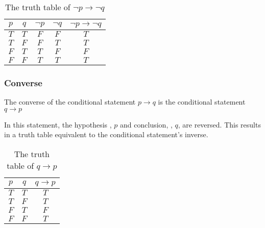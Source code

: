 \documentclass[12pt letter]{report}
\begin{document}
\begin{table}[h!]
	\caption{The truth table of $\neg p \to  \neg q$}\label{tab:7}
	\begin{center}
		\begin{tabular}{|c c|c c|c|}
			\hline
			$p$ & $q$ & $ \neg p $ & $\neg q$ & $\neg p \to  \neg q$ \\[0.5ex]
			\hline
			\hline
			$T$ & $T$ & $F$        & $F$      & $T$                  \\
			$T$ & $F$ & $F$        & $T$      & $T$                  \\
			$F$ & $T$ & $T$        & $F$      & $F$                  \\
			$F$ & $F$ & $T$        & $T$      & $T$                  \\
			\hline
		\end{tabular}
	\end{center}
\end{table}

\subsubsection{Converse}

 {
	The converse of the conditional statement $p \to q$ is the conditional statement $q \to p$
}

In this statement, the hypothesis , $p$ and conclusion, , $q$, are reversed. This results in a truth table equivalent to
the conditional statement's inverse.



\begin{table}[h!]
	\caption{The truth table of $q \to p$}\label{tab:8}
	\begin{center}
		\begin{tabular}{|c c|c|}
			\hline
			$p$ & $q$ & $q \to p$ \\[0.5ex]
			\hline
			\hline
			$T$ & $T$ & $T$       \\
			$T$ & $F$ & $T$       \\
			$F$ & $T$ & $F$       \\
			$F$ & $F$ & $T$       \\
			\hline
		\end{tabular}
	\end{center}
\end{table}
\end{document}
